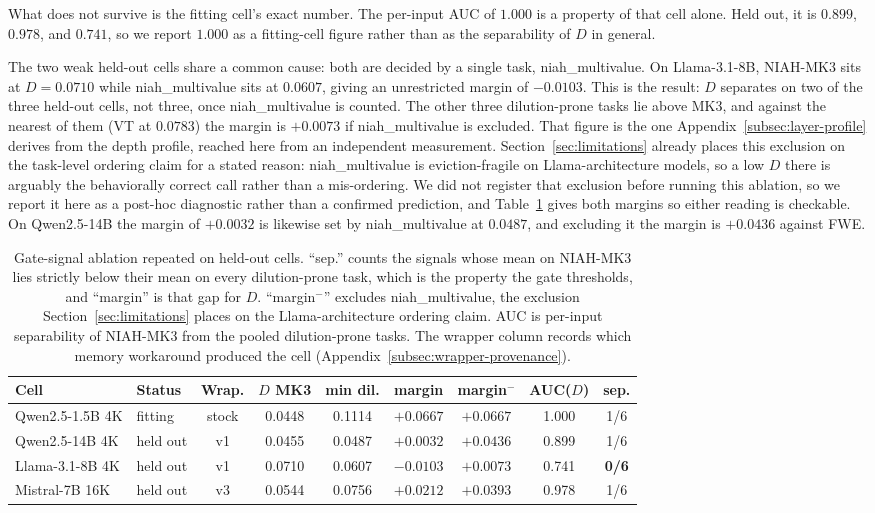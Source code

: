 What does not survive is the fitting cell's exact number. The per-input
AUC of $1.000$ is a property of that cell alone. Held out, it is $0.899$,
$0.978$, and $0.741$, so we report $1.000$ as a fitting-cell figure rather
than as the separability of $D$ in general.

The two weak held-out cells share a common cause: both are decided by a
single task, niah\_multivalue. On Llama-3.1-8B, NIAH-MK3 sits at $D =
0.0710$ while niah\_multivalue sits at $0.0607$, giving an unrestricted
margin of $-0.0103$. This is the result: $D$ separates on two of the
three held-out cells, not three, once niah\_multivalue is counted. The
other three
dilution-prone tasks lie above MK3, and against the nearest of them (VT
at $0.0783$) the margin is $+0.0073$ if niah\_multivalue is excluded.
That figure is the one Appendix~\ref{subsec:layer-profile} derives from
the depth profile, reached here from an independent measurement.
Section~\ref{sec:limitations} already places this exclusion on the
task-level ordering claim for a stated reason: niah\_multivalue is
eviction-fragile on Llama-architecture models, so a low $D$ there is
arguably the behaviorally correct call rather than a mis-ordering. We did
not register that exclusion before running this ablation, so we report
it here as a post-hoc diagnostic rather than a confirmed prediction, and
Table~\ref{tab:heldout-ablation} gives both margins so either reading is
checkable. On Qwen2.5-14B the margin of $+0.0032$ is likewise set by
niah\_multivalue at $0.0487$, and excluding it the margin is $+0.0436$
against FWE.

\begin{table}[h]
\centering
\caption{Gate-signal ablation repeated on held-out cells. ``sep.'' counts the
signals whose mean on NIAH-MK3 lies strictly below their mean on every
dilution-prone task, which is the property the gate thresholds, and ``margin''
is that gap for $D$. ``margin$^-$'' excludes niah\_multivalue, the exclusion
Section~\ref{sec:limitations} places on the Llama-architecture ordering claim.
AUC is per-input separability of NIAH-MK3 from the pooled dilution-prone tasks. The wrapper column records which memory workaround
produced the cell (Appendix~\ref{subsec:wrapper-provenance}).}
\label{tab:heldout-ablation}
\small
\begin{tabular}{llccccccc}
\toprule
Cell & Status & Wrap. & $D$ MK3 & min dil. & margin & margin$^-$ & AUC($D$) & sep. \\
\midrule
Qwen2.5-1.5B 4K & fitting  & stock & 0.0448 & 0.1114 & $+0.0667$ & $+0.0667$ & 1.000 & 1/6 \\
Qwen2.5-14B 4K  & held out & v1    & 0.0455 & 0.0487 & $+0.0032$ & $+0.0436$ & 0.899 & 1/6 \\
Llama-3.1-8B 4K & held out & v1    & 0.0710 & 0.0607 & $\mathbf{-0.0103}$ & $+0.0073$ & 0.741 & \textbf{0/6} \\
Mistral-7B 16K  & held out & v3    & 0.0544 & 0.0756 & $+0.0212$ & $+0.0393$ & 0.978 & 1/6 \\
\bottomrule
\end{tabular}
\end{table}

